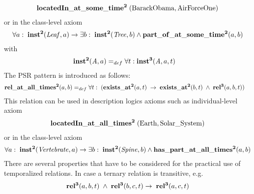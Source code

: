 \begin{equation}
\begin{split}
\mathrm{\mathbf{locatedIn\_at\_some\_time^2}} \;(\mathrm{BarackObama}, \mathrm{AirForceOne})  
\end{split}
\label{eq:personlocated}
\end{equation}
%
or in the class-level axiom
%
\begin{equation}
\begin{split}
\forall a:\; \mathrm{\mathbf{inst^2}}(\mathit{Leaf}, a) 
\rightarrow
\exists b:\;\mathrm{\mathbf{inst^2}}(\mathit{Tree}, b)
\wedge
\mathrm{\mathbf{part\_of\_at\_some\_time^2}}(a,b)  \end{split}
\label{eq:leaf}
\end{equation}
%
with 
%  
\begin{equation}
\begin{split}
\mathrm{\mathbf{inst^2}} (\mathit{A},a) =_{def}&\; \forall t: \mathrm{\mathbf{inst^3}}(\mathit{A},a,t)  
\end{split}
\label{eq:temporarily:inst}
\end{equation}
%
The PSR pattern is introduced as follows:  
%
\begin{equation}
\begin{split}
\mathrm{\mathbf{rel\_at\_all\_times^2}} (a,b) =_{def}&\;
\forall t: \; (\mathrm{\mathbf{exists\_at^2}} (a, t) \; \rightarrow \; \mathrm{\mathbf{exists\_at^2}} (b, t) \; \wedge \; \mathrm{\mathbf{rel^3}}(a,b,t))  
\end{split}
\label{eq:permanently:ind}
\end{equation}
%
This relation can be used in description logics axioms such as individual-level axiom
%
\begin{equation}
\begin{split}
\mathrm{\mathbf{locatedIn\_at\_all\_times^2}} \;(\mathrm{Earth}, \mathrm{Solar\_System})  
\end{split}
\label{eq:earth}
\end{equation}
%
or in the class-level axiom
%
\begin{equation}
\begin{split}
\forall a:\; \mathrm{\mathbf{inst^2}}(\mathit{Vertebrate}, a) 
\rightarrow
\exists b:\;\mathrm{\mathbf{inst^2}}(\mathit{Spine}, b)
\wedge
\mathrm{\mathbf{has\_part\_at\_all\_times^2}}(a,b)  \end{split}
\label{eq:spine}
\end{equation}
%  
There are several properties that have to be considered for the practical use of temporalized relations. In case a ternary relation is transitive, e.g.  
%
\begin{equation}
\begin{split}
\mathrm{\mathbf{rel^3}}(a,b,t) \; \wedge \; \mathrm{\mathbf{rel^3}}(b,c,t) \rightarrow \; \mathrm{\mathbf{rel^3}}(a,c,t)   
\end{split}
\label{eq:trtrans}
\end{equation}    
